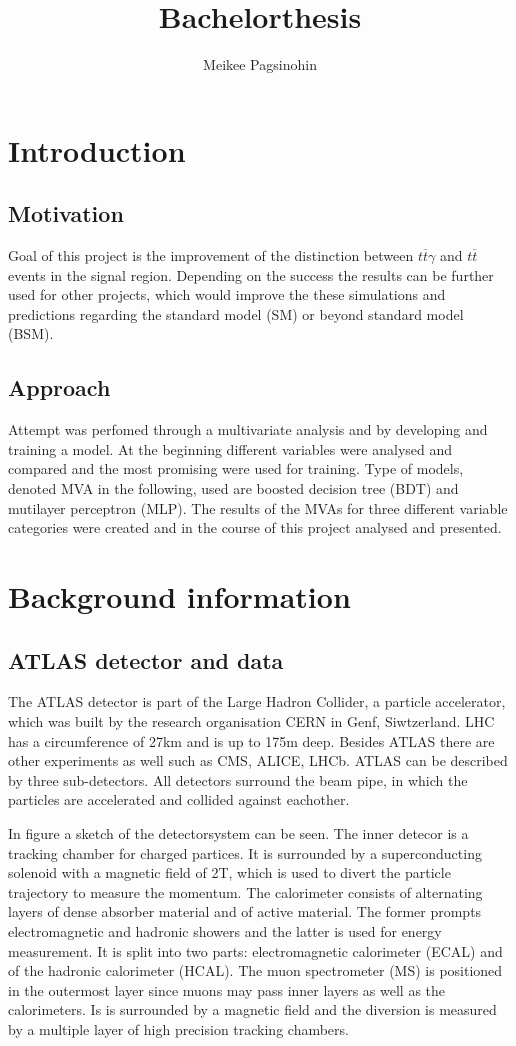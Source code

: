 \documentclass[11pt]{scrartcl}
\title{Bachelorthesis}
\author{Meikee Pagsinohin}
\begin{document}
\section{Introduction}

	\subsection{Motivation}
		Goal of this project is the improvement of the distinction between $t\overline{t}\gamma$ and $t\overline{t}$ events in the signal region. Depending on the success the results can be further used for other projects, which would improve the these simulations and predictions regarding the standard model (SM) or beyond standard model (BSM). 

	\subsection{Approach}
		Attempt was perfomed through a multivariate analysis and by developing and training a model. At the beginning different variables were analysed and compared and the most promising were used for training. Type of models, denoted MVA in the following, used are boosted decision tree (BDT) and mutilayer perceptron (MLP). The results of the MVAs for three different variable categories were created and in the course of this project analysed and presented.

\section{Background information}
	\subsection{ATLAS detector and data}
	The ATLAS detector is part of the Large Hadron Collider, a particle accelerator, which was built by the research organisation CERN in Genf, Siwtzerland. LHC has a circumference of 27km and is up to 175m deep. Besides ATLAS there are other experiments as well such as CMS, ALICE, LHCb. ATLAS can be described by three sub-detectors. All detectors surround the beam pipe, in which the particles are accelerated and collided against eachother.
	
	In figure a sketch of the detectorsystem can be seen. The inner detecor is a tracking chamber for charged partices. It is surrounded by a superconducting solenoid with a magnetic field of 2T, which is used to divert the particle trajectory to measure the momentum. The calorimeter consists of alternating layers of dense absorber material and of active material. The former prompts electromagnetic and hadronic showers and the latter is used for energy measurement. It is split into two parts: electromagnetic calorimeter (ECAL) and of the hadronic calorimeter (HCAL). The muon spectrometer (MS) is positioned in the outermost layer since muons may pass inner layers as well as the calorimeters. Is is surrounded by a magnetic field and the diversion is measured by a multiple layer of high precision tracking chambers. 
	
\end{document}
